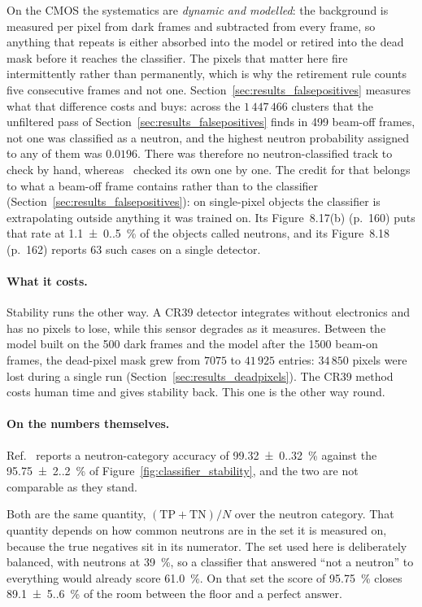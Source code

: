 \documentclass[a4paper,headsepline,oneside,11pt]{scrartcl}
\begin{document}
On the CMOS the systematics are \emph{dynamic and modelled}:
the background is measured per pixel from dark frames and subtracted from every
frame, so anything that repeats is either absorbed into the model or retired
into the dead mask before it reaches the classifier. The pixels that matter here
fire intermittently rather than permanently, which is why the retirement rule
counts five consecutive frames and not one. Section~\ref{sec:results_falsepositives} measures
what that difference costs and buys: across the $1\,447\,466$ clusters that the
unfiltered pass of Section~\ref{sec:results_falsepositives} finds in 499 beam-off
frames, not one was classified as a neutron, and the highest neutron probability
assigned to any of them was $0.0196$. There was therefore no neutron-classified
track to check by hand, whereas~\cite{Filter2018} checked its own one by one.
The credit for that belongs to what a beam-off frame contains rather than to
the classifier (Section~\ref{sec:results_falsepositives}): on single-pixel
objects the classifier is extrapolating outside anything it was trained on.
Its Figure~8.17(b) (p.~160) puts that rate at \SI{1.1(0.5)}{\percent} of the objects
called neutrons, and its Figure~8.18 (p.~162) reports $63$ such cases on a single
detector.

\paragraph{What it costs.} Stability runs the other way. A CR39 detector
integrates without electronics and has no pixels to lose, while this sensor
degrades as it measures. Between the model built on the 500
dark frames and the model after the 1500 beam-on frames, the dead-pixel mask grew
from $7075$ to $41\,925$ entries: $34\,850$ pixels were lost during a single
run (Section~\ref{sec:results_deadpixels}). The CR39 method costs human time and gives stability back. This one is the
other way round.

\paragraph{On the numbers themselves.} Ref.~\cite{Filter2018} reports a neutron-category
accuracy of \SI{99.32(0.32)}{\percent} against the \SI{95.75(2.20)}{\percent} of
Figure~\ref{fig:classifier_stability}, and the two are not comparable as
they stand.

Both are the same quantity, $(\mathrm{TP}+\mathrm{TN})/N$ over the neutron
category. That quantity depends on how common neutrons are in the set it is
measured on, because the true negatives sit in its numerator. The set used here
is deliberately balanced, with neutrons at \SI{39}{\percent}, so a classifier that
answered ``not a neutron'' to everything would already score \SI{61.0}{\percent}. On that
set the score of \SI{95.75}{\percent} closes \SI{89.1(5.6)}{\percent} of the room between the
floor and a perfect answer.
\end{document}
